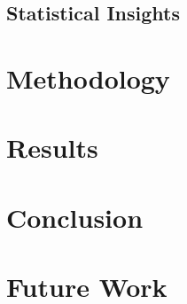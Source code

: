 \documentclass{article}
\begin{document}
\subsection{Statistical Insights}

\section{Methodology}

\section{Results}

\section{Conclusion}

\section{Future Work}
\end{document}
